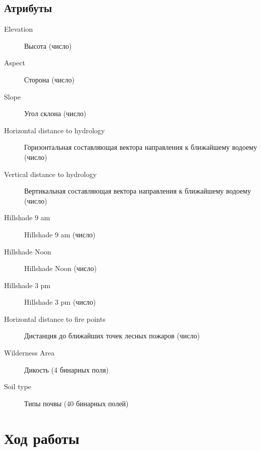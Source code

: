 \documentclass[12pt, a4paper] {article}
\begin{document}
\subsection{Атрибуты}
\begin{description}
  \item[Elevation] Высота (число)
  \item[Aspect] Сторона (число)
  \item[Slope] Угол склона (число)
  \item[Horizontal distance to hydrology] Горизонтальная составляющая вектора направления к ближайшему водоему (число)
  \item[Vertical distance to hydrology] Вертикальная составляющая вектора направления к ближайшему водоему (число)
  \item[Hillshade 9 am] Hillshade 9 am (число)
  \item[Hillshade Noon] Hillshade Noon (число)
  \item[Hillshade 3 pm] Hillshade 3 pm (число)
  \item[Horizontal distance to fire points] Дистанция до ближайших точек лесных пожаров (число)
  \item[Wilderness Area] Дикость (4 бинарных поля)
  \item[Soil type] Типы почвы (40 бинарных полей)
\end{description}

\section{Ход работы}
\inputminted{python}{listing.py}
\end{document}
